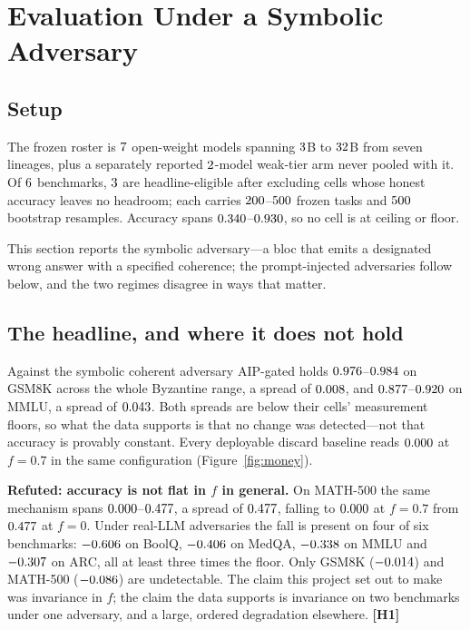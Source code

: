 \section{Evaluation Under a Symbolic Adversary}
\label{sec:evaluation}

\subsection{Setup}

The frozen roster is $7$ open-weight models spanning $3$B
to $32$B from seven lineages, plus a separately reported
$2$-model weak-tier arm never pooled with it. Of
$6$ benchmarks, $3$ are headline-eligible after
excluding cells whose honest accuracy leaves no headroom; each carries
$200$--$500$ frozen tasks and $500$
bootstrap resamples. Accuracy spans $0.340$--$0.930$, so no
cell is at ceiling or floor.

This section reports the symbolic adversary---a bloc that emits a designated
wrong answer with a specified coherence; the prompt-injected adversaries follow
below, and the two regimes disagree in ways that matter.

\subsection{The headline, and where it does not hold}

Against the symbolic coherent adversary AIP-gated holds
$0.976$--$0.984$ on GSM8K across the whole Byzantine range, a
spread of $0.008$, and $0.877$--$0.920$ on MMLU, a
spread of $0.043$. Both spreads are below their cells' measurement
floors, so what the data supports is that no change was detected---not that
accuracy is provably constant. Every deployable discard baseline reads
$0.000$ at $f=0.7$ in the same configuration
(Figure~\ref{fig:money}).

\textbf{Refuted: accuracy is not flat in $f$ in general.} On MATH-500 the same
mechanism spans $0.000$--$0.477$, a spread of
$0.477$, falling to $0.000$ at $f=0.7$ from
$0.477$ at $f=0$. Under real-LLM adversaries the fall is present
on four of six benchmarks: $-0.606$ on BoolQ, $-0.406$ on
MedQA, $-0.338$ on MMLU and $-0.307$ on ARC, all at least
three times the floor. Only GSM8K ($-0.014$) and MATH-500
($-0.086$) are undetectable. The claim this project set out to make
was invariance in $f$; the claim the data supports is invariance on two
benchmarks under one adversary, and a large, ordered degradation elsewhere.
\textbf{[H1]}

